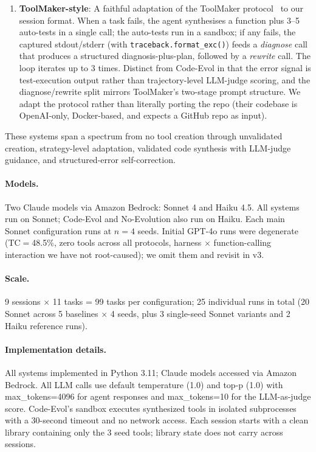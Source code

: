 \documentclass[sigconf,anonymous,review,natbib=false]{acmart}
\begin{document}
\begin{enumerate}
\item \textbf{ToolMaker-style}: A faithful adaptation of the ToolMaker protocol~\cite{wolflein2025toolmaker} to our session format. When a task fails, the agent synthesises a function plus 3--5 auto-tests in a single call; the auto-tests run in a sandbox; if any fails, the captured stdout/stderr (with \texttt{traceback.format\_exc()}) feeds a \emph{diagnose} call that produces a structured diagnosis-plus-plan, followed by a \emph{rewrite} call. The loop iterates up to 3 times. Distinct from Code-Evol in that the error signal is test-execution output rather than trajectory-level LLM-judge scoring, and the diagnose/rewrite split mirrors ToolMaker's two-stage prompt structure. We adapt the protocol rather than literally porting the repo (their codebase is OpenAI-only, Docker-based, and expects a GitHub repo as input).
\end{enumerate}

These systems span a spectrum from no tool creation through unvalidated creation, strategy-level adaptation, validated code synthesis with LLM-judge guidance, and structured-error self-correction.

\paragraph{Models.} Two Claude models via Amazon Bedrock: Sonnet 4 and Haiku 4.5. All systems run on Sonnet; Code-Evol and No-Evolution also run on Haiku. Each main Sonnet configuration runs at $n{=}4$ seeds. Initial GPT-4o runs were degenerate (TC$=$48.5\%, zero tools across all protocols, harness$\,\times\,$function-calling interaction we have not root-caused); we omit them and revisit in v3.

\paragraph{Scale.} 9 sessions $\times$ 11 tasks = 99 tasks per configuration; 25 individual runs in total (20 Sonnet across 5 baselines $\times$ 4 seeds, plus 3 single-seed Sonnet variants and 2 Haiku reference runs).

\paragraph{Implementation details.} All systems implemented in Python 3.11; Claude models accessed via Amazon Bedrock. All LLM calls use default temperature (1.0) and top-p (1.0) with max\_tokens=4096 for agent responses and max\_tokens=10 for the LLM-as-judge score. Code-Evol's sandbox executes synthesized tools in isolated subprocesses with a 30-second timeout and no network access. Each session starts with a clean library containing only the 3 seed tools; library state does not carry across sessions.
\end{document}
